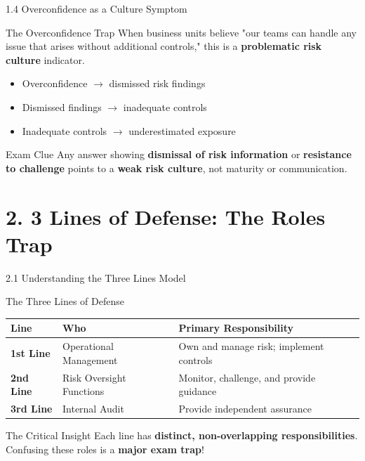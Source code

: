 \documentclass{beamer}
\begin{document}
	\begin{frame}{1.4 Overconfidence as a Culture Symptom}
		\begin{block}{The Overconfidence Trap}
			When business units believe "our teams can handle any issue that arises without additional controls," this is a \textbf{problematic risk culture} indicator.
		\end{block}
		
		\begin{itemize}
			\item Overconfidence $\rightarrow$ dismissed risk findings
			\item Dismissed findings $\rightarrow$ inadequate controls
			\item Inadequate controls $\rightarrow$ underestimated exposure
		\end{itemize}
		
		\begin{alertblock}{Exam Clue}
			Any answer showing \textbf{dismissal of risk information} or \textbf{resistance to challenge} points to a \textbf{weak risk culture}, not maturity or communication.
		\end{alertblock}
	\end{frame}
	
	\section{2. 3 Lines of Defense: The Roles Trap}
	
	\begin{frame}{2.1 Understanding the Three Lines Model}
		\begin{block}{The Three Lines of Defense}
			\begin{tabular}{|p{2.5cm}|p{4cm}|p{4cm}|}
				\hline
				\textbf{Line} & \textbf{Who} & \textbf{Primary Responsibility} \\
				\hline
				\textbf{1st Line} & Operational Management & Own and manage risk; implement controls \\
				\hline
				\textbf{2nd Line} & Risk Oversight Functions & Monitor, challenge, and provide guidance \\
				\hline
				\textbf{3rd Line} & Internal Audit & Provide independent assurance \\
				\hline
			\end{tabular}
		\end{block}
		
		\begin{alertblock}{The Critical Insight}
			Each line has \textbf{distinct, non-overlapping responsibilities}. Confusing these roles is a \textbf{major exam trap}!
		\end{alertblock}
	\end{frame}
	
\end{document}
